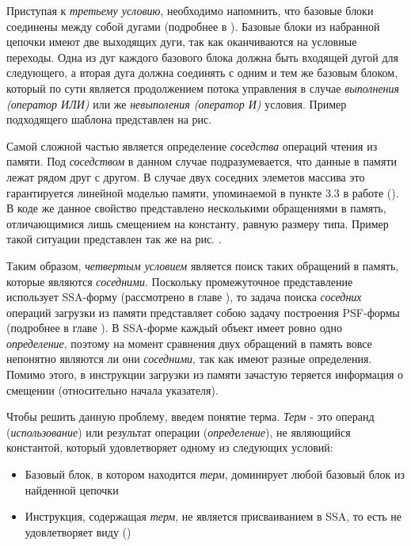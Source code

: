 Приступая к \textit{третьему условию}, необходимо напомнить, что базовые блоки соединены между собой дугами (подробнее в \todo[глава]). Базовые блоки из набранной цепочки имеют две выходящих дуги, так как оканчиваются на условные переходы. Одна из дуг каждого базового блока должна быть входящей дугой для следующего, а вторая дуга должна соединять с одним и тем же базовым блоком, который по сути является продолжением потока управления в случае \textit{выполнения (оператор ИЛИ)} или же \textit{невыполения (оператор И)} условия. Пример подходящего шаблона представлен на рис. \todo[рисунок]



Самой сложной частью является определение \textit{соседства} операций чтения из памяти. Под \textit{соседством} в данном случае подразумевается, что данные в памяти лежат рядом друг с другом. В случае двух соседних элеметов массива это гарантируется линейной моделью памяти, упоминаемой в пункте 3.3 в работе (\todo[работа]). В коде же данное свойство представлено несколькими обращениями в память, отличающимися лишь смещением на константу, равную размеру типа. Пример такой ситуации представлен так же на рис. \todo[номер]. 

Таким образом, \textit{четвертым условием} является поиск таких обращений в память, которые являются \textit{соседними}. Поскольку промежуточное представление использует SSA-форму (рассмотрено в главе \todo[глава]), то задача поиска \textit{соседних} операций загрузки из памяти представляет собою задачу построения PSF-формы (подробнее в главе \todo[глава]). В SSA-форме каждый объект имеет ровно одно \textit{определение}, поэтому на момент сравнения двух обращений в память вовсе непонятно являются ли они \textit{соседними}, так как имеют разные определения. Помимо этого, в инструкции загрузки из памяти зачастую теряется информация о смещении (относительно начала указателя). 

Чтобы решить данную проблему, введем понятие терма. \textit{Терм} - это операнд (\textit{использование}) или результат операции (\textit{определение}), не являющийся константой, который удовлетворяет одному из следующих условий:

\begin{itemize}
    \item Базовый блок, в котором находится \textit{терм}, доминирует любой базовый блок из найденной цепочки
    \item Инструкция, содержащая \textit{терм}, не является присваиванием в SSA, то есть не удовлетворяет виду ()
\end{itemize}

